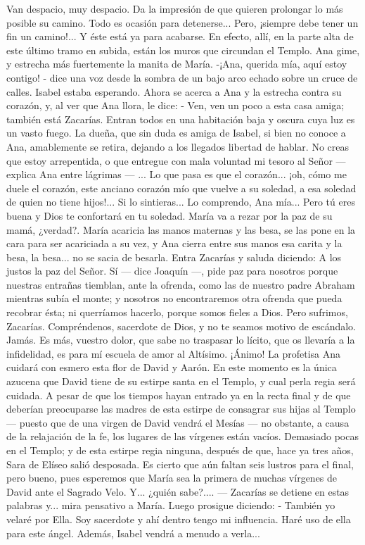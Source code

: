 \documentclass[12pt]{book} %
\begin{document}
Van despacio, muy despacio. Da la impresión de que quieren prolongar lo más posible su camino. Todo es ocasión para 
detenerse... Pero, ¡siempre debe tener un fin un camino!... Y éste está ya para acabarse. En efecto, allí, en la parte alta de este último tramo en subida, están los muros que circundan el Templo. Ana gime, y estrecha más fuertemente la manita de María. -¡Ana, querida mía, aquí estoy contigo! - dice una voz desde la sombra de un bajo arco echado sobre un cruce de calles. Isabel estaba esperando. Ahora se acerca a Ana y la estrecha contra su corazón, y, al ver que Ana llora, le dice: - Ven, ven un poco a esta casa amiga; también está Zacarías. 
Entran todos en una habitación baja y oscura cuya luz es un vasto fuego. La dueña, que sin duda es amiga de Isabel, si 
bien no conoce a Ana, amablemente se retira, dejando a los llegados libertad de hablar. 
No creas que estoy arrepentida, o que entregue con mala voluntad mi tesoro al Señor — explica Ana entre lágrimas — ... Lo que pasa es que el corazón... ¡oh, cómo me duele el corazón, este anciano corazón mío que vuelve a su soledad, a esa soledad de quien no tiene hijos!... Si lo sintieras... 
Lo comprendo, Ana mía... Pero tú eres buena y Dios te confortará en tu soledad. María va a rezar por la paz de su mamá, ¿verdad?. 
María acaricia las manos maternas y las besa, se las pone en la cara para ser acariciada a su vez, y Ana cierra entre sus 
manos esa carita y la besa, la besa... no se sacia de besarla. 
Entra Zacarías y saluda diciendo: 
A los justos la paz del Señor. 
Sí — dice Joaquín —, pide paz para nosotros porque nuestras entrañas tiemblan, ante la ofrenda, como las de nuestro padre Abraham mientras subía el monte; y nosotros no encontraremos otra ofrenda que pueda recobrar ésta; ni querríamos hacerlo, porque somos fieles a Dios. Pero sufrimos, Zacarías. Compréndenos, sacerdote de Dios, y no te seamos motivo de escándalo. 
Jamás. Es más, vuestro dolor, que sabe no traspasar lo lícito, que os llevaría a la infidelidad, es para mí escuela de 
amor al Altísimo. ¡Ánimo! La profetisa Ana cuidará con esmero esta flor de David y Aarón. En este momento es la única azucena que David tiene de su estirpe santa en el Templo, y cual perla regia será cuidada. A pesar  de que los tiempos hayan entrado ya en la recta final y de que deberían preocuparse las madres de esta estirpe de consagrar sus hijas al Templo — puesto que de una virgen de David vendrá el Mesías — no obstante, a causa de la relajación de la fe, los lugares de las vírgenes están vacíos. Demasiado pocas en el Templo; y de esta estirpe regia ninguna, después de que, hace ya tres años, Sara de Elíseo salió desposada. Es cierto que aún faltan seis lustros para el final, pero bueno, pues esperemos que María sea la primera de muchas vírgenes de David ante el Sagrado Velo. Y... ¿quién sabe?.... — Zacarías se detiene en estas palabras y... mira pensativo a María. Luego prosigue diciendo: - También yo velaré por Ella. Soy sacerdote y ahí dentro tengo mi influencia. Haré uso de ella para este ángel. Además, Isabel vendrá a menudo a verla... 
\end{document}
